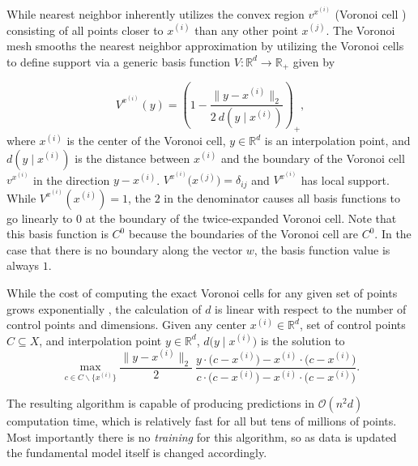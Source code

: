 \documentclass[conference]{IEEEtran}
\begin{document}
While nearest neighbor inherently utilizes the convex region $v^{x^{(i)}}$ (Voronoi cell \cite{dirichlet1850reduction}) consisting of all points closer to $x^{(i)}$ than any other point $x^{(j)}$. The Voronoi mesh \cite{lux2018novel} smooths the nearest neighbor approximation by utilizing the Voronoi cells to define support via a generic basis function $V: \mathbb{R}^d \rightarrow \mathbb{R}_+$ given by

$$ V^{x^{(i)}}(y) = \left(1 - \frac{\bigl\|y - x^{(i)}\bigr\|_2}{2 \ d(y \mid x^{(i)})} \right)_+, $$
where $x^{(i)}$ is the center of the Voronoi cell, $y \in \mathbb{R}^d$ is an interpolation point, and $d(y \mid x^{(i)})$ is the distance between $x^{(i)}$ and the boundary of the Voronoi cell $v^{x^{(i)}}$ in the direction $y - x^{(i)}$. $V^{x^{(i)}}\bigl(x^{(j)}\bigr) = \delta_{ij}$ and $V^{x^{(i)}}$ has local support. While $V^{x^{(i)}}(x^{(i)}) = 1$, the $2$ in the denominator causes all basis functions to go linearly to $0$ at the boundary of the twice-expanded Voronoi cell. Note that this basis function is $C^0$ because the boundaries of the Voronoi cell are $C^0$. In the case that there is no boundary along the vector $w$, the basis function value is always $1$.

While the cost of computing the exact Voronoi cells for any given set of points grows exponentially \cite{dutour2009complexity}, the calculation of $d$ is linear with respect to the number of control points and dimensions. Given any center $x^{(i)} \in \mathbb{R}^d$, set of control points $C \subseteq X$, and interpolation point $y \in \mathbb{R}^d$, $d\bigl(y \mid x^{(i)}\bigr)$ is the solution to
$$
  \max_{c \in C\backslash\{x^{(i)}\}} \frac{\bigl\|y - x^{(i)}\bigr\|_2}{2} \ \frac{y \cdot \bigl(c - x^{(i)}\bigr) - x^{(i)} \cdot \bigl(c - x^{(i)}\bigr)}{c \cdot \bigl(c - x^{(i)}\bigr) - x^{(i)} \cdot \bigl(c - x^{(i)}\bigr)}.
$$

The resulting algorithm is capable of producing predictions in $\mathcal{O}(n^2 d)$ computation time, which is relatively fast for all but tens of millions of points. Most importantly there is no \textit{training} for this algorithm, so as data is updated the fundamental model itself is changed accordingly.

\end{document}
